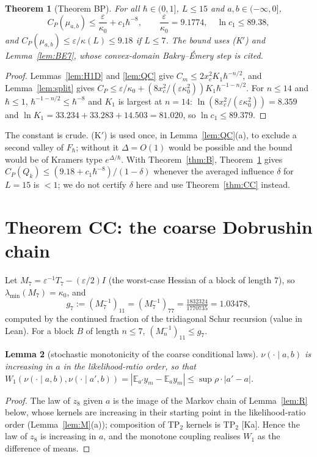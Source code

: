 \documentclass[11pt,a4paper]{article}
\newtheorem{theorem}{Theorem}[section]
\newtheorem{lemma}[theorem]{Lemma}
\theoremstyle{definition}
\theoremstyle{remark}
\newcommand{\E}{\mathbb{E}}
\newcommand{\xc}{x_c}
\begin{document}
\begin{theorem}[Theorem BP]\label{thm:BP}
For all $\hbar\in(0,1]$, $L\le15$ and $a,b\in(-\infty,0]$,
\[
C_P(\mu_{a,b})\le\frac{\varepsilon}{\kappa_0}+c_1\hbar^{-8},\qquad \frac{\varepsilon}{\kappa_0}=9.1774,\quad \ln c_1\le89.38 ,
\]
and $C_P(\mu_{a,b})\le\varepsilon/\kappa(L)\le9.18$ if $L\le7$. The bound uses \textup{(K$'$)} and Lemma~\ref{lem:BE7}, whose convex-domain Bakry--\'Emery step is cited.
\end{theorem}
\begin{proof}
Lemmas~\ref{lem:H1D} and \ref{lem:QC} give $C_m\le2\xc^2K_1\hbar^{-n/2}$, and Lemma~\ref{lem:split} gives $C_P\le\varepsilon/\kappa_0+(8\xc^2/(\varepsilon\kappa_0^2))K_1\hbar^{-1-n/2}$. For $n\le14$ and $\hbar\le1$, $\hbar^{-1-n/2}\le\hbar^{-8}$ and $K_1$ is largest at $n=14$: $\ln(8\xc^2/(\varepsilon\kappa_0^2))=8.359$ and $\ln K_1=33.234+33.283+14.503=81.020$, so $\ln c_1\le89.379$.
\end{proof}

The constant is crude. (K$'$) is used once, in Lemma~\ref{lem:QC}(a), to exclude a second valley of $F_\hbar$; without it $\Delta=O(1)$ would be possible and the bound would be of Kramers type $e^{\Delta/\hbar}$. With Theorem~\ref{thm:B}, Theorem~\ref{thm:BP} gives $C_P(Q_k)\le(9.18+c_1\hbar^{-8})/(1-\delta)$ whenever the averaged influence $\delta$ for $L=15$ is $<1$; we do not certify $\delta$ here and use Theorem~\ref{thm:CC} instead.

\section{Theorem CC: the coarse Dobrushin chain}\label{sec:CC}

Let $M_7=\varepsilon^{-1}T_7-(\varepsilon/2)I$ (the worst-case Hessian of a block of length $7$), so $\lambda_{\min}(M_7)=\kappa_0$, and
\[
g_7:=(M_7^{-1})_{11}=(M_7^{-1})_{77}=\tfrac{1832324}{1770735}=1.03478 ,
\]
computed by the continued fraction of the tridiagonal Schur recursion (value in Lean). For a block $B$ of length $n\le7$, $(M_n^{-1})_{11}\le g_7$.

\begin{lemma}[stochastic monotonicity of the coarse conditional laws]\label{lem:B1}
$\nu(\cdot\mid a,b)$ is increasing in $a$ in the likelihood-ratio order, so that $W_1(\nu(\cdot\mid a,b),\nu(\cdot\mid a',b))=|\E_{a'}y_m-\E_ay_m|\le\sup\rho\cdot|a'-a|$.
\end{lemma}
\begin{proof}
The law of $z_8$ given $a$ is the image of the Markov chain of Lemma~\ref{lem:R} below, whose kernels are increasing in their starting point in the likelihood-ratio order (Lemma~\ref{lem:M}(a)); composition of TP$_2$ kernels is TP$_2$ [Ka]. Hence the law of $z_8$ is increasing in $a$, and the monotone coupling realises $W_1$ as the difference of means.
\end{proof}
\end{document}
